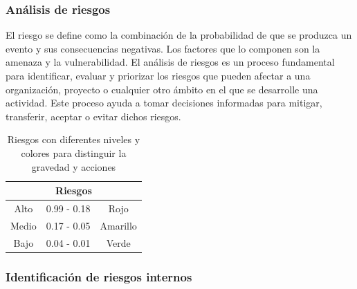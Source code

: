 \subsubsection{Análisis de riesgos}

El riesgo se define como la combinación de la probabilidad de que se produzca un evento y sus consecuencias negativas. Los factores que lo componen son la amenaza y la vulnerabilidad.\cite{Riesgo}
\newline
El análisis de riesgos es un proceso fundamental para identificar, evaluar y priorizar los riesgos que pueden afectar a una organización, proyecto o cualquier otro ámbito en el que se desarrolle una actividad. Este proceso ayuda a tomar decisiones informadas para mitigar, transferir, aceptar o evitar dichos riesgos. 
\begin{table}[h]
        \centering
        \caption{Riesgos con diferentes niveles y colores para distinguir la gravedad y acciones}
        \begin{tabular}{c c c}
        \hline
        \multicolumn{3}{c}{\textbf{Riesgos}}\\
        \hline
             Alto& 0.99 - 0.18 & Rojo  \\
        \hline
             Medio& 0.17 - 0.05 & Amarillo  \\
        \hline
             Bajo& 0.04 - 0.01 & Verde \\
        \hline     
        \end{tabular}
        \label{tab:riego}
    \end{table}
%
%
\subsubsection{Identificación de riesgos internos}

